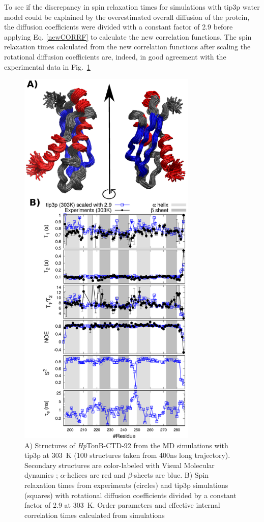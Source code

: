\documentclass[journal=jpcbfk,manuscript=article]{achemso}
\begin{document}
To see if the discrepancy in spin relaxation times for simulations with tip3p water model
could be explained by the overestimated overall diffusion of the protein,
the diffusion coefficients were divided with a constant factor of 2.9 before applying
Eq. \ref{newCORRF} to calculate the new correlation functions. The spin
relaxation times calculated from the new correlation functions after scaling
the rotational diffusion coefficients are, indeed, in good agreement with
the experimental data in Fig.~\ref{HpTonBrelaxationDATAscaled}
\begin{figure}[!h]
  \includegraphics[width=8.5cm]{../Figs/RELdataHpTonB2.eps}%
  \caption{A) Structures of {\it Hp}TonB-CTD-92 from the MD simulations with tip3p at 303~K
    (100 structures taken from 400ns long trajectory). Secondary structures
    are color-labeled with Visual Molecular dynamics \cite{frishman95,humphrey96};
    $\alpha$-helices are red and $\beta$-sheets are blue.
    B) Spin relaxation times from experiments (circles) and tip3p
    simulations (squares) with rotational diffusion coefficients divided by a
    constant factor of 2.9 at 303~K. Order parameters and effective internal correlation
    times calculated from simulations
    \label{HpTonBrelaxationDATAscaled}}%
\end{figure}
\end{document}
